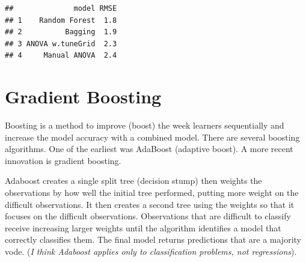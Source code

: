 \documentclass[
]{book}
\newenvironment{Shaded}{\begin{snugshade}}{\end{snugshade}}
\newcommand{\DataTypeTok}[1]{\textcolor[rgb]{0.13,0.29,0.53}{#1}}
\newcommand{\DecValTok}[1]{\textcolor[rgb]{0.00,0.00,0.81}{#1}}
\newcommand{\KeywordTok}[1]{\textcolor[rgb]{0.13,0.29,0.53}{\textbf{#1}}}
\newcommand{\NormalTok}[1]{#1}
\newcommand{\OperatorTok}[1]{\textcolor[rgb]{0.81,0.36,0.00}{\textbf{#1}}}
\newcommand{\StringTok}[1]{\textcolor[rgb]{0.31,0.60,0.02}{#1}}
\begin{document}
\begin{Shaded}
\end{Shaded}

\begin{verbatim}
##              model RMSE
## 1    Random Forest  1.8
## 2          Bagging  1.9
## 3 ANOVA w.tuneGrid  2.3
## 4     Manual ANOVA  2.4
\end{verbatim}

\hypertarget{gradient-boosting}{%
\section{Gradient Boosting}\label{gradient-boosting}}

Boosting is a method to improve (boost) the week learners sequentially and increase the model accuracy with a combined model. There are several boosting algorithms. One of the earliest was AdaBoost (adaptive boost). A more recent innovation is gradient boosting.

Adaboost creates a single split tree (decision stump) then weights the observations by how well the initial tree performed, putting more weight on the difficult observations. It then creates a second tree using the weights so that it focuses on the difficult observations. Observations that are difficult to classify receive increasing larger weights until the algorithm identifies a model that correctly classifies them. The final model returns predictions that are a majority vode. (\emph{I think Adaboost applies only to classification problems, not regressions}).
\end{document}
